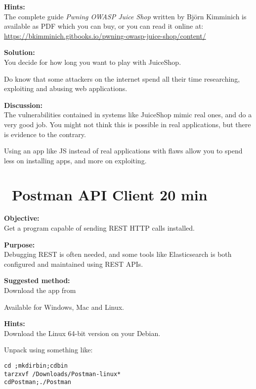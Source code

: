 \documentclass[a4paper,11pt,notitlepage]{report}
\begin{document}
 {\bf Hints:}\\
 The complete guide \emph{Pwning OWASP Juice Shop}
written by Björn Kimminich is available as PDF which you can buy, or you can read it online at:\\
\url{https://bkimminich.gitbooks.io/pwning-owasp-juice-shop/content/}

 {\bf Solution:}\\
 You decide for how long you want to play with JuiceShop.

 Do know that some attackers on the internet spend all their time researching, exploiting and abusing web applications.

 {\bf Discussion:}\\
The vulnerabilities contained in systems like JuiceShop mimic real ones, and do a very good job. You might not think this is possible in real applications, but there is evidence to the contrary.

Using an app like JS instead of real applications with flaws allow you to spend less on installing apps, and more on exploiting.






\chapter{\faInfoCircle\ Postman API Client 20 min}
\label{ex:postman-api}


{\bf Objective:}\\
Get a program capable of sending REST HTTP calls installed.


{\bf Purpose:}\\
Debugging REST is often needed, and some tools like Elasticsearch is both configured and maintained using REST APIs.

{\bf Suggested method:}\\
Download the app from

Available for Windows, Mac and Linux.

{\bf Hints:}\\
Download the Linux 64-bit version on your Debian.

Unpack using something like:
\begin{alltt}
cd ~;mkdir bin;cd bin
tar zxvf ~/Downloads/Postman-linux*
cd Postman;./Postman
\end{alltt}
\end{document}
